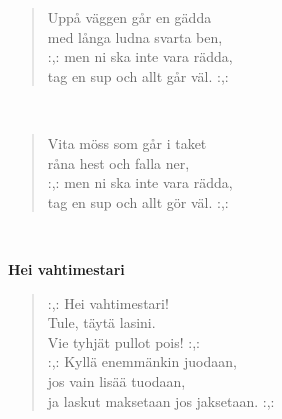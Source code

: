 \noindent\begin{minipage}{\linewidth}
\begin{verse}
	Uppå väggen går en gädda\\
	med långa ludna svarta ben,\\
	\hspace{0pt-\widthof{:,: }}:,: men ni ska inte vara rädda,\\
	tag en sup och allt går väl. :,:\\
\end{verse}
\end{minipage}\\[10pt]
\noindent\begin{minipage}{\linewidth}
\begin{verse}
	Vita möss som går i taket\\
	råna hest och falla ner,\\
	\hspace{0pt-\widthof{:,: }}:,: men ni ska inte vara rädda,\\
	tag en sup och allt gör väl. :,:\\
	
\end{verse}
\end{minipage}\\[10pt]
%
%
\noindent\begin{minipage}{\linewidth}
\vspace{5pt}
\parbox[t]{0.85\linewidth}{\raggedright {\large\bf Hei vahtimestari}\\[6pt]}
\begin{verse}
	\hspace{0pt-\widthof{:,: }}:,: Hei vahtimestari!\\
	Tule, täytä lasini.\\
	Vie tyhjät pullot pois! :,:\\
	\hspace{0pt-\widthof{:,: }}:,: Kyllä enemmänkin juodaan,\\
	jos vain lisää tuodaan,\\
	ja laskut maksetaan jos jaksetaan. :,:\\
\end{verse}
\end{minipage}\\[10pt]

